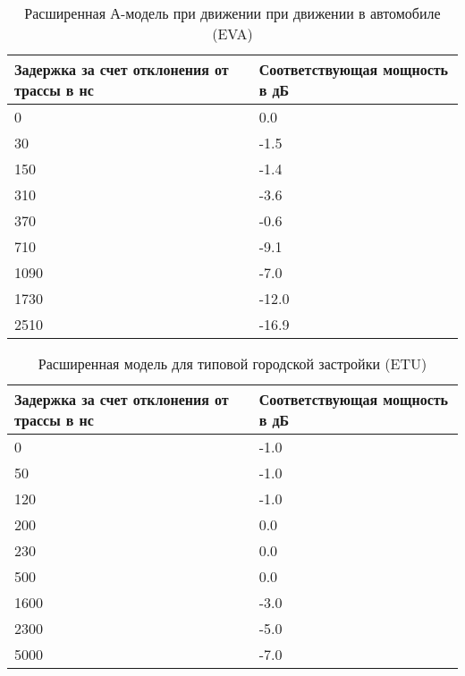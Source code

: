 \begin{table} [htb]
  \centering
\parbox{15cm}{\caption{Расширенная А-модель при движении при движении в автомобиле (EVA) \cite{TS36104}}\label{EVA}}
\begin{tabular}{|p{7cm}|p{7cm}|}
    \hline
    \hline
    Задержка за счет отклонения от трассы в нс &  Соответствующая мощность в дБ \\ \hline \hline
    0                                          & 0.0                           \\ \hline
    30                                         & -1.5                          \\ \hline
    150                                        & -1.4                          \\ \hline
    310                                        & -3.6                          \\ \hline
    370                                        & -0.6                          \\ \hline
    710                                        & -9.1                          \\ \hline
    1090                                       & -7.0                          \\ \hline
    1730                                       & -12.0                         \\ \hline
    2510                                       & -16.9                         \\ \hline
    \end{tabular}
\end{table}


\begin{table} [htb]
  \centering
\parbox{15cm}{\caption{Расширенная модель для типовой городской застройки (ETU) \cite{TS36104}}\label{ETU}}
\begin{tabular}{|p{7cm}|p{7cm}|}
    \hline
    \hline
    Задержка за счет отклонения от трассы в нс &  Соответствующая мощность в дБ \\ \hline \hline
    0    & -1.0 \\ \hline
    50   & -1.0 \\ \hline
    120  & -1.0 \\ \hline
    200  & 0.0  \\ \hline
    230  & 0.0  \\ \hline
    500  & 0.0  \\ \hline
    1600 & -3.0 \\ \hline
    2300 & -5.0 \\ \hline
    5000 & -7.0 \\ \hline
    \end{tabular}
\end{table}




